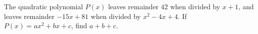 The quadratic polynomial $P(x)$ leaves remainder $42$ when divided by $x+1$, and leaves remainder $-15x+81$ when divided by $x^2-4x+4$. If $P(x)=ax^2+bx+c$, find $a+b+c$.
